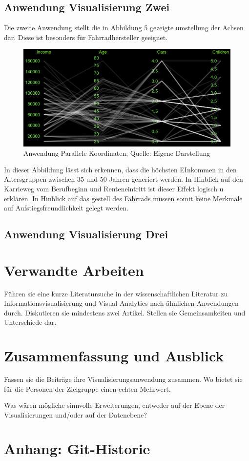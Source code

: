 \documentclass[usegeometry=true]{scrartcl}
\begin{document}
\subsection{Anwendung Visualisierung Zwei}
Die zweite Anwendung stellt die in Abbildung 5 gezeigte umstellung der Achsen dar. Diese ist besonders für Fahrradhersteller geeignet.
\begin{figure}[h]
\begin{center}
\includegraphics[width=16cm]{Bilder/ParallelCoordsA2.png}
\caption{Anwendung Parallele Koordinaten, Quelle: Eigene Darstellung}
\end{center}
\end{figure}
\newline In dieser Abbildung lässt sich erkennen, dass die höchsten EInkommen in den Altersgruppen zwischen 35 und 50 Jahren generiert werden. In Hinblick auf den Karrieweg vom Berufbeginn und Renteneintritt ist dieser Effekt logisch u erklären. In Hinblick auf das gestell des Fahrrads müssen somit keine Merkmale auf Aufstiegsfreundlichkeit gelegt werden. 

\subsection{Anwendung Visualisierung Drei}

\section{Verwandte Arbeiten}
Führen sie eine kurze Literatursuche in der wissenschaftlichen Literatur zu Informationsvisualisierung und Visual Analytics nach ähnlichen Anwendungen durch. Diskutieren sie mindestens zwei Artikel. Stellen sie Gemeinsamkeiten und Unterschiede dar.

\section{Zusammenfassung und Ausblick}
Fassen sie die Beiträge ihre Visualisierungsanwendung zusammen. Wo bietet sie für die Personen der Zielgruppe einen echten Mehrwert.

Was wären mögliche sinnvolle Erweiterungen, entweder auf der Ebene der Visualisierungen und/oder auf der Datenebene?

\section*{Anhang: Git-Historie}
\newpage

\end{document}

